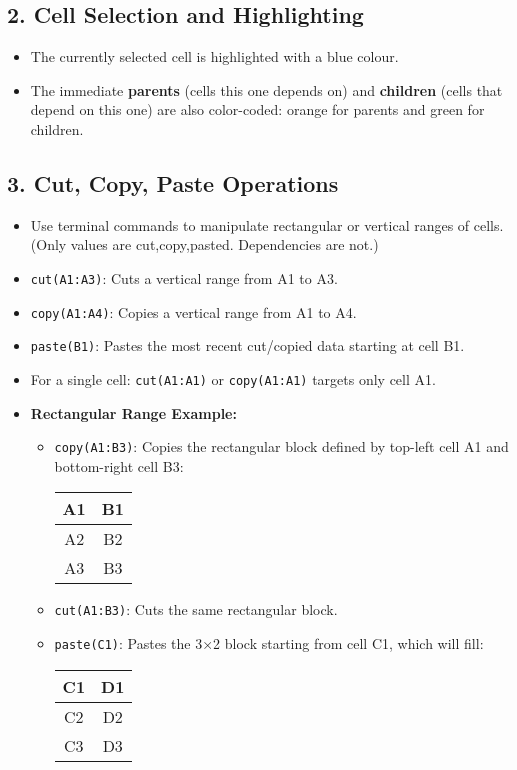 \documentclass{article}
\begin{document}
\subsection*{2. Cell Selection and Highlighting}
\begin{itemize}
    \item The currently selected cell is highlighted with a blue colour.
    \item The immediate \textbf{parents} (cells this one depends on) and \textbf{children} (cells that depend on this one) are also color-coded: orange for parents and green for children.
\end{itemize}

\subsection*{3. Cut, Copy, Paste Operations}
\begin{itemize}
    \item Use terminal commands to manipulate rectangular or vertical ranges of cells.(Only values are cut,copy,pasted. Dependencies are not.)
    \item \texttt{cut(A1:A3)}: Cuts a vertical range from A1 to A3.
    \item \texttt{copy(A1:A4)}: Copies a vertical range from A1 to A4.
    \item \texttt{paste(B1)}: Pastes the most recent cut/copied data starting at cell B1.
    \item For a single cell: \texttt{cut(A1:A1)} or \texttt{copy(A1:A1)} targets only cell A1.
    \item \textbf{Rectangular Range Example:}
    \begin{itemize}
        \item \texttt{copy(A1:B3)}: Copies the rectangular block defined by top-left cell A1 and bottom-right cell B3:
        \begin{center}
        \begin{tabular}{|c|c|}
        \hline
        A1 & B1 \\
        \hline
        A2 & B2 \\
        \hline
        A3 & B3 \\
        \hline
        \end{tabular}
        \end{center}
        \item \texttt{cut(A1:B3)}: Cuts the same rectangular block.
        \item \texttt{paste(C1)}: Pastes the 3×2 block starting from cell C1, which will fill:
        \begin{center}
        \begin{tabular}{|c|c|}
        \hline
        C1 & D1 \\
        \hline
        C2 & D2 \\
        \hline
        C3 & D3 \\
        \hline
        \end{tabular}
        \end{center}
    \end{itemize}
\end{itemize}
\end{document}
